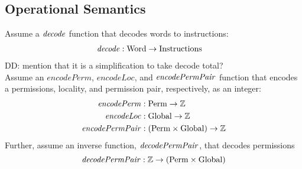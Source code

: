 \documentclass[a4paper]{article}
\newcommand{\fun}{\rightarrow}
\newcommand\dominique[1]{{\color{purple} \sf \footnotesize {DD: #1}}\\}
\newcommand{\plainfun}[2]{
  \ifthenelse{\equal{#2}{}}
  {\mathit{#1}}
  {\mathit{#1}(#2)}
}
\newcommand{\decode}{\plainfun{decode}{}}
\newcommand{\encodePerm}{\mathit{encodePerm}}
\newcommand{\encodePermPair}{\plainfun{encodePermPair}{}}
\newcommand{\encodeLoc}{\mathit{encodeLoc}{}}
\newcommand{\decodePermPair}{\plainfun{decodePermPair}}
\newcommand{\plaindom}[1]{\mathrm{#1}}
\newcommand{\Words}{\plaindom{Word}}
\newcommand{\Instrs}{\plaindom{Instructions}}
\newcommand{\ints}{\mathbb{Z}}
\newcommand{\Perms}{\plaindom{Perm}}
\newcommand{\Globals}{\plaindom{Global}}
\begin{document}
\subsection{Operational Semantics}
Assume a $\decode$ function that decodes words to instructions:
\begin{align*}
  \decode &:\Words \fun \Instrs
\end{align*}
\dominique{mention that it is a simplification to take decode total?}
Assume an $\encodePerm$, $\encodeLoc$, and $\encodePermPair$ function that encodes a permissions, locality, and permission pair, respectively, as an integer:
\begin{align*}
  \encodePerm &: \Perms \fun \ints \\
  \encodeLoc &: \Globals \fun \ints \\
  \encodePermPair &: (\Perms \times \Globals) \fun \ints \\
\end{align*}
Further, assume an inverse function, $\decodePermPair{}$, that decodes permissions
\[
  \decodePermPair{} : \ints \fun (\Perms \times \Globals)
\]
\end{document}
